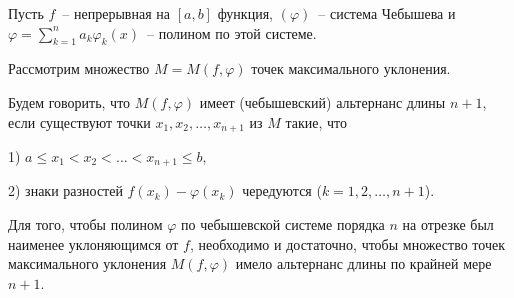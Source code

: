 Пусть $f$~-- непрерывная на $[a,b]$ функция, $(\varphi)$~-- система Чебышева
и $\varphi=\sum\limits_{k=1}^n a_k \varphi_k(x)$~-- полином по этой
системе.

Рассмотрим множество $M=M(f,\varphi)$ точек максимального уклонения.

Будем говорить, что $M(f,\varphi)$ имеет (чебышевский) альтернанс длины $n+1$,
если существуют точки $x_1, x_2,\ldots,x_{n+1}$ из $M$ такие, что

1) $a\le x_1<x_2<\ldots<x_{n+1}\le b$,

2) знаки разностей $f(x_k)-\varphi(x_k)$ чередуются
($k=1,2,\ldots,n+1$).

\begin{teo}[П.\,Л.\,Чебышев]
Для того, чтобы полином $\varphi$ по чебышевской системе порядка $n$ на отрезке был
наименее уклоняющимся от $f$, необходимо и достаточно, чтобы
множество точек максимального уклонения $M(f,\varphi)$ имело альтернанс длины
по крайней мере $n+1$.
\end{teo}

